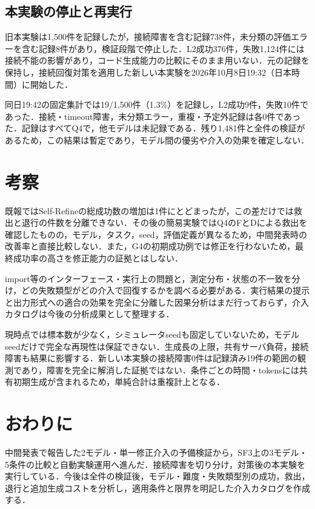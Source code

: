 \documentclass[a4paper,8pt,twocolumn]{extarticle}
\begin{document}
\subsection{本実験の停止と再実行}
旧本実験は1,500件を記録したが，接続障害を含む記録738件，未分類の評価エラーを含む記録8件があり，検証段階で停止した．L2成功376件，失敗1,124件には接続不能の影響があり，コード生成能力の比較にそのまま用いない．元の記録を保持し，接続回復対策を適用した新しい本実験を2026年10月8日19:32（日本時間）に開始した．

同日19:42の固定集計では19/1,500件（1.3\%）を記録し，L2成功9件，失敗10件であった．接続・timeout障害，未分類エラー，重複・予定外記録は各0件であった．記録はすべてQ4で，他モデルは未記録である．残り1,481件と全件の検証があるため，この結果は暫定であり，モデル間の優劣や介入の効果を確定しない．

\section{考察}
既報ではSelf-Refineの総成功数の増加は1件にとどまったが，この差だけでは救出と退行の件数を分離できない．その後の簡易実験ではQ4のFとDによる救出を確認したものの，モデル，タスク，seed，評価定義が異なるため，中間発表時の改善率と直接比較しない．また，G4の初期成功例では修正を行わないため，最終成功率の高さを修正能力の証拠とはしない．

import等のインターフェース・実行上の問題と，測定分布・状態の不一致を分け，どの失敗類型がどの介入で回復するかを調べる必要がある．実行結果の提示と出力形式への適合の効果を完全に分離した因果分析はまだ行っておらず，介入カタログは今後の分析成果として整理する．

現時点では標本数が少なく，シミュレータseedも固定していないため，モデルseedだけで完全な再現性は保証できない．生成長の上限，共有サーバ負荷，接続障害も結果に影響する．新しい本実験の接続障害0件は記録済み19件の範囲の観測であり，障害を完全に解消した証拠ではない．条件ごとの時間・tokensには共有初期生成が含まれるため，単純合計は重複計上となる．

\section{おわりに}
中間発表で報告した2モデル・単一修正介入の予備検証から，SF3上の3モデル・5条件の比較と自動実験運用へ進んだ．接続障害を切り分け，対策後の本実験を実行している．今後は全件の検証後，モデル・難度・失敗類型別の成功，救出，退行と追加生成コストを分析し，適用条件と限界を明記した介入カタログを作成する．
\end{document}
